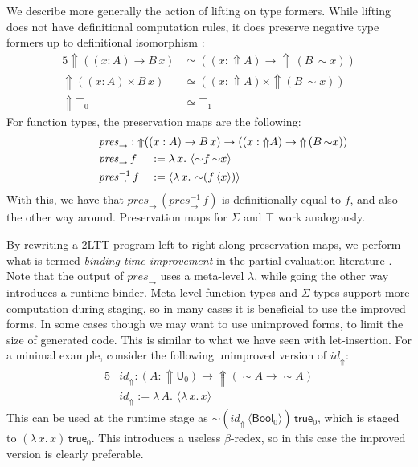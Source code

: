 \documentclass[acmsmall,review]{acmart}
\newcommand{\mit}[1]{\mathit{#1}}
\newcommand{\msf}[1]{\mathsf{#1}}
\newcommand{\Lift}{{\Uparrow}}
\newcommand{\spl}{{\sim}}
\newcommand{\qut}[1]{\langle #1\rangle}
\renewcommand{\U}{\msf{U}}
\newcommand{\Bool}{\msf{Bool}}
\newcommand{\true}{\msf{true}}
\theoremstyle{remark}
\begin{document}
We describe more generally the action of lifting on type formers. While lifting
does not have definitional computation rules, it does preserve negative type formers up
to definitional isomorphism \cite[Section~2.3]{twolevel}:
\begin{alignat*}{5}
  \Lift((x : A) \to B\,x) &\simeq ((x : \Lift A) \to \Lift\,(B\,\spl x))\\
  \Lift ((x : A) \times B\,x) &\simeq ((x : \Lift A) \times \Lift (B\,\spl x))\\
  \Lift \top_0 &\simeq \top_1
\end{alignat*}
For function types, the preservation maps are the following:
\begin{alignat*}{5}
  & \hspace{-6em}\rlap{$\mit{pres}_\to : \Lift((x : A) \to B\,x) \to ((x : \Lift A) \to \Lift\,(B\,\spl x))$}\\
  & \hspace{-6em}\mit{pres}_\to\,f     &&:= \lambda\,x.\,\,\qut{\spl f\,\spl x}\\
  & \hspace{-6em}\mit{pres}_\to^{-1}\,f &&:= \qut{\lambda\,x.\,\,\spl(f\,\qut{x})}
\end{alignat*}
With this, we have that $\mit{pres}_\to\,(\mit{pres}_\to^{-1}\,f)$ is
definitionally equal to $f$, and also the other way around. Preservation maps
for $\Sigma$ and $\top$ work analogously.

By rewriting a 2LTT program left-to-right along preservation maps, we perform
what is termed \emph{binding time improvement} in the partial evaluation
literature \cite[Chapter~12]{partial-evaluation}. Note that the output of $\mit{pres}_{\to}$ uses a
meta-level $\lambda$, while going the other way introduces a runtime
binder. Meta-level function types and $\Sigma$ types support more computation during
staging, so in many cases it is beneficial to use the improved forms. In some
cases though we may want to use unimproved forms, to limit the size of generated
code. This is similar to what we have seen with let-insertion. For a minimal
example, consider the following unimproved version of $\mit{id}_\Lift$:
\begin{alignat*}{5}
  & \mit{id}_\Lift : (A : \Lift \U_0) \to \Lift(\spl A \to \spl A) \\
  & \mit{id}_\Lift := \lambda\,A.\,\,\qut{\lambda\,x.\,x}
\end{alignat*}
This can be used at the runtime stage as
$\spl(\mit{id}_\Lift\,\qut{\Bool_0})\,\true_0$, which is staged to
$(\lambda\,x.\,x)\,\true_0$.  This introduces a useless $\beta$-redex, so in
this case the improved version is clearly preferable.
\end{document}
